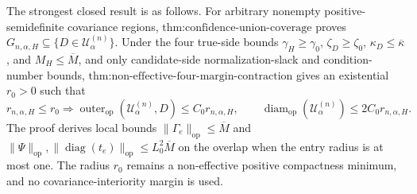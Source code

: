 The strongest closed result is as follows. For arbitrary nonempty positive-semidefinite covariance regions, \(\text{thm:confidence-union-coverage}\) proves \(G_{n,\alpha,H}\subseteq\{D\in\mathcal U^{(n)}_\alpha\}\). Under the four true-side bounds \(\gamma_H\geq\gamma_0\), \(\zeta_D\geq\zeta_0\), \(\kappa_D\leq\overline\kappa\), and \(M_H\leq\overline M\), and only candidate-side normalization-slack and condition-number bounds, \(\text{thm:non-effective-four-margin-contraction}\) gives an existential \(r_0>0\) such that
\[
r_{n,\alpha,H}\leq r_0
\Longrightarrow
\operatorname{outer}_{\mathrm{op}}(\mathcal U^{(n)}_\alpha,D)
\leq C_0r_{n,\alpha,H},
\qquad
\operatorname{diam}_{\mathrm{op}}(\mathcal U^{(n)}_\alpha)
\leq2C_0r_{n,\alpha,H}.
\]
The proof derives local bounds \(\|\Gamma_e\|_{\mathrm{op}}\leq\overline M\) and \(\|\Psi\|_{\mathrm{op}},\|\operatorname{diag}(t_e)\|_{\mathrm{op}}\leq L_0^2\overline M\) on the overlap when the entry radius is at most one. The radius \(r_0\) remains a non-effective positive compactness minimum, and no covariance-interiority margin is used.